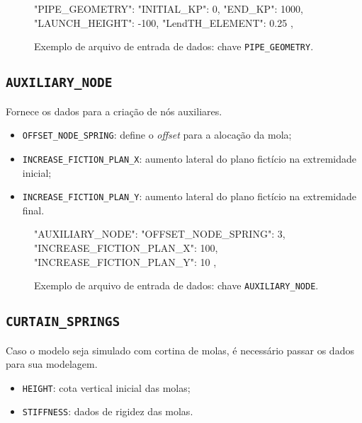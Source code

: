 \begin{figure}
\caption{Exemplo de arquivo de entrada de dados: chave \texttt{PIPE\_GEOMETRY}.\label{lst:pipe-geometry}}
\begin{jsoncode}
{
  "PIPE_GEOMETRY": {
    "INITIAL_KP": 0,
    "END_KP": 1000,
    "LAUNCH_HEIGHT": -100,
    "LendTH_ELEMENT": 0.25
  },
}
\end{jsoncode}
\end{figure}

\subsection{\texttt{AUXILIARY\_NODE}}

Fornece os dados para a criação de nós auxiliares.

\begin{itemize}
  \item \texttt{OFFSET\_NODE\_SPRING}: define o \textit{offset} para a alocação da mola;
  \item \texttt{INCREASE\_FICTION\_PLAN\_X}: aumento lateral do plano fictício na extremidade inicial;
  \item \texttt{INCREASE\_FICTION\_PLAN\_Y}: aumento lateral do plano fictício na extremidade final.
\end{itemize}

\begin{figure}
\caption{Exemplo de arquivo de entrada de dados: chave \texttt{AUXILIARY\_NODE}.\label{lst:auxiliary-node}}
\begin{jsoncode}
{
  "AUXILIARY_NODE": {
    "OFFSET_NODE_SPRING": 3,
    "INCREASE_FICTION_PLAN_X": 100,
    "INCREASE_FICTION_PLAN_Y": 10
  },
}
\end{jsoncode}
\end{figure}

\subsection{\texttt{CURTAIN\_SPRINGS}}

Caso o modelo seja simulado com cortina de molas, é necessário passar os dados para sua modelagem.

\begin{itemize}
  \item \texttt{HEIGHT}: cota vertical inicial das molas;
  \item \texttt{STIFFNESS}: dados de rigidez das molas.
\end{itemize}

